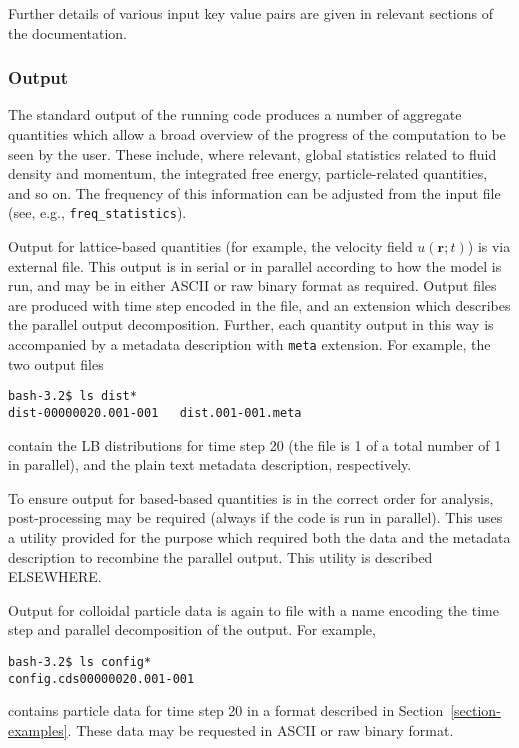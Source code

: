 Further details of various input key value pairs are given in
relevant sections of the documentation.

\subsubsection{Output}

The standard output of the running code produces a number of
aggregate quantities which allow a broad overview of the progress
of the computation to be seen by the user. These include, where
relevant, global statistics related to fluid density and momentum,
the integrated free energy, particle-related quantities, and so on.
The frequency of this information can be adjusted from the input
file (see, e.g., \texttt{freq\_statistics}).

Output for lattice-based quantities (for example, the velocity field
$u(\mathbf{r}; t)$) is via external file. This output is in serial
or in parallel according to how the model is run, and may be in
either ASCII or raw binary format as required. Output files are produced
with time step encoded in the file, and an extension which describes the
parallel output decomposition. Further, each quantity output in this way
is accompanied by a metadata description with \texttt{meta} extension.
For example, the two output files
\begin{lstlisting}
bash-3.2$ ls dist*
dist-00000020.001-001   dist.001-001.meta
\end{lstlisting}
contain the LB distributions for time step 20 (the file is 1 of a total
number of 1 in parallel), and the plain text metadata description,
respectively.

To ensure output for based-based quantities is in the correct order for
analysis, post-processing
may be required (always if the code is run in parallel). This uses a utility
provided for the purpose which required both the data and the metadata
description to recombine the parallel output. This utility is described
ELSEWHERE.

Output for colloidal particle data is again to file with a name encoding
the time step and parallel decomposition of the output. For example,
\begin{lstlisting}
bash-3.2$ ls config*
config.cds00000020.001-001
\end{lstlisting}
contains particle data for time step 20 in a format described in
Section~\ref{section-examples}.
These data may be requested in ASCII or raw binary format.

